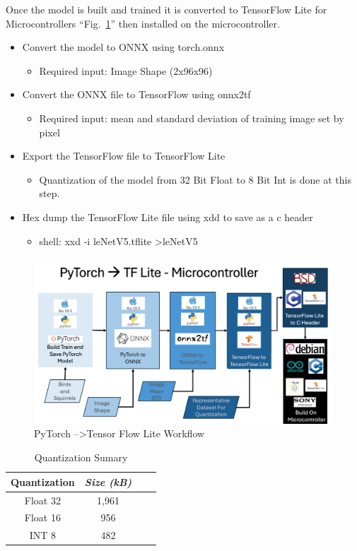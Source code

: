 \documentclass[conference]{IEEEtran}
\begin{document}
Once the model is built and trained it is converted to TensorFlow Lite for Microcontrollers ``Fig.~\ref{torch2tf}'' then installed on the microcontroller.
\begin{itemize}
	\item Convert the model to ONNX using torch.onnx
	\begin{itemize}
		\item Required input:  Image Shape (2x96x96)
	\end{itemize}
	\item Convert the ONNX file to TensorFlow using onnx2tf
	\begin{itemize}
		\item Required input:  mean and standard deviation of training image set by pixel
	\end{itemize}
	\item Export the TensorFlow file to TensorFlow Lite
	\begin{itemize}
		\item Quantization of the model from 32 Bit Float to 8 Bit Int is done at this step.
	\end{itemize}
	\item Hex dump the TensorFlow Lite file using xdd to save as a c header
	\begin{itemize}
		\item shell: xxd -i leNetV5.tflite \textgreater leNetV5
	\end{itemize}
\end{itemize}

\begin{figure}[htbp]
\centerline{\includegraphics[scale=0.3]{pyTorch2TFLite.png}}
\caption{PyTorch --\textgreater Tensor Flow Lite Workflow}
\label{torch2tf}
\end{figure}

\begin{table}[htbp]
\caption{Quantization Sumary}
\begin{center}
\begin{tabular}{|c|c|c|c|}
\hline
\textbf{Quantization} & \textbf{\textit{Size (kB)}}    \\ \hline 
	Float 32& 1,961 \\ \hline 
	Float 16& 956 \\ \hline 
	INT 8& 482 \\ \hline 
\end{tabular}
\label{quantSum}
\end{center}
\end{table}
\end{document}
